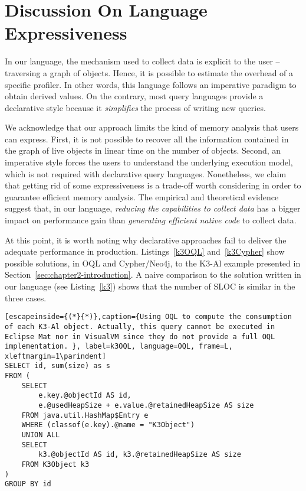 \section{Discussion On Language Expressiveness}\label{sec:expressiveness}

In our language, the mechanism used to collect data is explicit to the user -- traversing a graph of objects.
Hence, it is possible to estimate the overhead of a specific profiler.
In other words, this language follows an imperative paradigm to obtain derived values.
On the contrary, most query languages provide a declarative style because it \textit{simplifies} the process of writing new queries.

We acknowledge that our approach limits the kind of memory analysis that users can express.
First, it is not possible to recover all the information contained in the graph of live objects in linear time on the number of objects.
Second, an imperative style forces the users to understand the underlying execution model, which is not required with declarative query languages.
Nonetheless, we claim that getting rid of some expressiveness is a trade-off worth considering in order to guarantee efficient memory analysis.
The empirical and theoretical evidence suggest that, in our language, \textit{reducing the capabilities to collect data} has a bigger impact on performance gain than \textit{generating efficient native code} to collect data.

At this point, it is worth noting why declarative approaches fail to deliver the adequate performance in production.
Listings~\ref{k3OQL} and~\ref{k3Cypher} show possible solutions, in OQL and Cypher/Neo4j, to the K3-Al example presented in Section~\ref{sec:chapter2-introduction}.
A naive comparison to the solution written in our language (see Listing~\ref{k3}) shows that the number of \gls{SLOC} is similar in the three cases.

\begin{lstlisting}[escapeinside={(*}{*)},caption={Using OQL to compute the consumption of each K3-Al object. Actually, this query cannot be executed in Eclipse Mat nor in VisualVM since they do not provide a full OQL implementation. }, label=k3OQL, language=OQL, frame=L, xleftmargin=1\parindent]
SELECT id, sum(size) as s
FROM (
	SELECT
		e.key.@objectId AS id, 
		e.@usedHeapSize + e.value.@retainedHeapSize AS size
	FROM java.util.HashMap$Entry e
	WHERE (classof(e.key).@name = "K3Object")
	UNION ALL
	SELECT 
		k3.@objectId AS id, k3.@retainedHeapSize AS size 
	FROM K3Object k3
)
GROUP BY id
\end{lstlisting}

